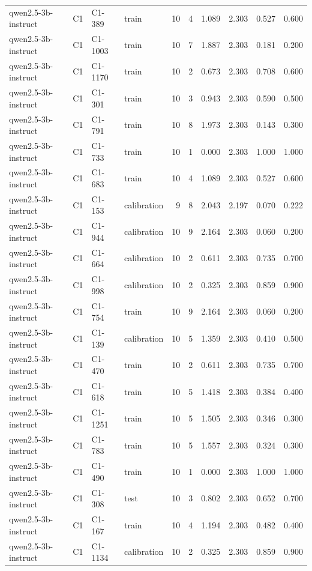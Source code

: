 \begin{table}
\begin{tabular}{llllrrrrrr}
qwen2.5-3b-instruct & C1 & C1-389 & train & 10 & 4 & 1.089 & 2.303 & 0.527 & 0.600 \\
qwen2.5-3b-instruct & C1 & C1-1003 & train & 10 & 7 & 1.887 & 2.303 & 0.181 & 0.200 \\
qwen2.5-3b-instruct & C1 & C1-1170 & train & 10 & 2 & 0.673 & 2.303 & 0.708 & 0.600 \\
qwen2.5-3b-instruct & C1 & C1-301 & train & 10 & 3 & 0.943 & 2.303 & 0.590 & 0.500 \\
qwen2.5-3b-instruct & C1 & C1-791 & train & 10 & 8 & 1.973 & 2.303 & 0.143 & 0.300 \\
qwen2.5-3b-instruct & C1 & C1-733 & train & 10 & 1 & 0.000 & 2.303 & 1.000 & 1.000 \\
qwen2.5-3b-instruct & C1 & C1-683 & train & 10 & 4 & 1.089 & 2.303 & 0.527 & 0.600 \\
qwen2.5-3b-instruct & C1 & C1-153 & calibration & 9 & 8 & 2.043 & 2.197 & 0.070 & 0.222 \\
qwen2.5-3b-instruct & C1 & C1-944 & calibration & 10 & 9 & 2.164 & 2.303 & 0.060 & 0.200 \\
qwen2.5-3b-instruct & C1 & C1-664 & calibration & 10 & 2 & 0.611 & 2.303 & 0.735 & 0.700 \\
qwen2.5-3b-instruct & C1 & C1-998 & calibration & 10 & 2 & 0.325 & 2.303 & 0.859 & 0.900 \\
qwen2.5-3b-instruct & C1 & C1-754 & train & 10 & 9 & 2.164 & 2.303 & 0.060 & 0.200 \\
qwen2.5-3b-instruct & C1 & C1-139 & calibration & 10 & 5 & 1.359 & 2.303 & 0.410 & 0.500 \\
qwen2.5-3b-instruct & C1 & C1-470 & train & 10 & 2 & 0.611 & 2.303 & 0.735 & 0.700 \\
qwen2.5-3b-instruct & C1 & C1-618 & train & 10 & 5 & 1.418 & 2.303 & 0.384 & 0.400 \\
qwen2.5-3b-instruct & C1 & C1-1251 & train & 10 & 5 & 1.505 & 2.303 & 0.346 & 0.300 \\
qwen2.5-3b-instruct & C1 & C1-783 & train & 10 & 5 & 1.557 & 2.303 & 0.324 & 0.300 \\
qwen2.5-3b-instruct & C1 & C1-490 & train & 10 & 1 & 0.000 & 2.303 & 1.000 & 1.000 \\
qwen2.5-3b-instruct & C1 & C1-308 & test & 10 & 3 & 0.802 & 2.303 & 0.652 & 0.700 \\
qwen2.5-3b-instruct & C1 & C1-167 & train & 10 & 4 & 1.194 & 2.303 & 0.482 & 0.400 \\
qwen2.5-3b-instruct & C1 & C1-1134 & calibration & 10 & 2 & 0.325 & 2.303 & 0.859 & 0.900 \\

\end{tabular}
\end{table}
